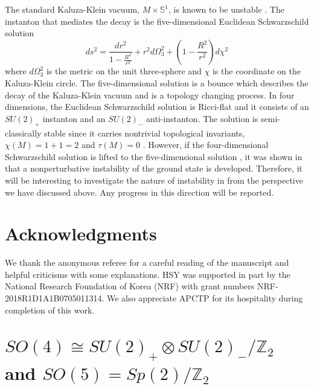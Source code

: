 \documentclass[12pt,epsf]{article}
\begin{document}
The standard Kaluza-Klein vacuum, $M \times \mathbb{S}^1$, is known to be unstable \cite{kk-bubble,kk-bubble1,kk-bubble2,bon-string}.
The instanton that mediates the decay is the five-dimensional Euclidean Schwarzschild solution
\begin{equation}\label{kk-bubble}
  ds^2 = \frac{dr^2}{1-\frac{R^2}{r^2}} + r^2 d\Omega_3^2 + \left(1-\frac{R^2}{r^2}\right) d \chi^2
\end{equation}
where $d\Omega_3^2$ is the metric on the unit three-sphere and $\chi$ is the coordinate on the Kaluza-Klein
circle. The five-dimensional solution  is a bounce which describes the decay of
the Kaluza-Klein vacuum and is a topology changing process.
In four dimensions, the Euclidean Schwarzschild solution \cite{euc-bh} is Ricci-flat and
it consists of an $SU(2)_+$ instanton and an $SU(2)_-$ anti-instanton.
The solution is semi-classically stable since it carries nontrivial topological invariants,
$\chi(M) = 1+1 = 2$ and $\tau(M) = 0$ \cite{egh-report,opy-jhep}.
However, if the four-dimensional Schwarzschild solution
is lifted to the five-dimensional solution ,
it was shown in \cite{kk-bubble} that a nonperturbative instability of the ground state is developed.
Therefore, it will be interesting to investigate the nature of
instability in \cite{kk-bubble,kk-bubble1,kk-bubble2,bon-string} from the perspective we have discussed above.
Any progress in this direction will be reported.




\section*{Acknowledgments}


We thank the anonymous referee for a careful reading of the manuscript and helpful criticisms with some explanations.
HSY was supported in part by the National Research Foundation of Korea (NRF)
with grant numbers NRF-2018R1D1A1B0705011314.
We also appreciate APCTP for its hospitality during completion of this work.



\appendix


\section{$SO(4) \cong SU(2)_+ \otimes SU(2)_-/\mathbb{Z}_2$ and $SO(5) = Sp(2)/\mathbb{Z}_2$}
\end{document}
